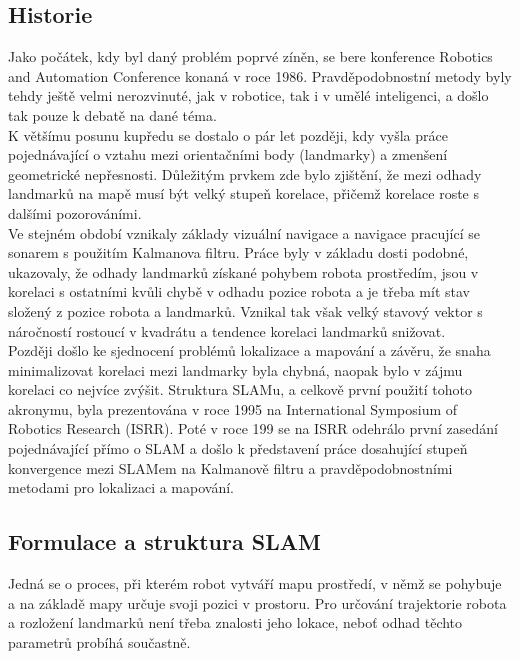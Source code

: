 \documentclass[11pt]{article}
\begin{document}
\subsection{Historie}
Jako počátek, kdy byl daný problém poprvé zíněn, se bere konference Robotics and Automation Conference konaná v roce 1986. Pravděpodobnostní metody byly tehdy ještě velmi nerozvinuté, jak v robotice, tak i v umělé inteligenci, a došlo tak pouze k debatě na dané téma.\\
\indent K většímu posunu kupředu se dostalo o pár let později, kdy vyšla práce pojednávající o vztahu mezi orientačními body (landmarky) a zmenšení geometrické nepřesnosti. Důležitým prvkem zde bylo zjištění, že mezi odhady landmarků na mapě musí být velký stupeň korelace, přičemž korelace roste s dalšími pozorováními.\\
\indent Ve stejném období vznikaly základy vizuální navigace a navigace pracující se sonarem s použitím Kalmanova filtru. Práce byly v základu dosti podobné, ukazovaly, že odhady landmarků získané pohybem robota prostředím, jsou v korelaci s ostatními kvůli chybě v odhadu pozice robota a je třeba mít stav složený z pozice robota a landmarků. Vznikal tak však velký stavový vektor s náročností rostoucí v kvadrátu a tendence korelaci landmarků snižovat.\\
\indent Později došlo ke sjednocení problémů lokalizace a mapování a závěru, že snaha minimalizovat korelaci mezi landmarky byla chybná, naopak bylo v zájmu korelaci co nejvíce zvýšit. Struktura SLAMu, a celkově první použití tohoto akronymu, byla prezentována v roce 1995 na International Symposium of Robotics Research (ISRR). Poté v roce 199 se na ISRR odehrálo první zasedání pojednávající přímo o SLAM a došlo k představení práce dosahující stupeň konvergence mezi SLAMem na Kalmanově filtru a pravděpodobnostními metodami pro lokalizaci a mapování.

\subsection{Formulace a struktura SLAM} 
Jedná se o proces, při kterém robot vytváří mapu prostředí, v němž se pohybuje a na základě mapy určuje svoji pozici v prostoru. Pro určování trajektorie robota a rozložení landmarků není třeba znalosti jeho lokace, neboť odhad těchto parametrů probíhá součastně. 
\end{document}
